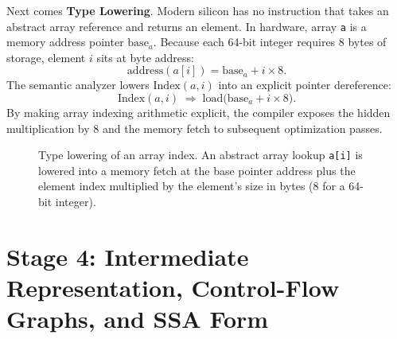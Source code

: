 Next comes \textbf{Type Lowering}. Modern silicon has no instruction that takes
an abstract array reference and returns an element. In hardware, array \texttt{a}
is a memory address pointer $\text{base}_a$. Because each 64-bit integer
requires $8$ bytes of storage, element $i$ sits at byte address:
\[
  \text{address}(a[i]) = \text{base}_a + i \times 8.
\]
The semantic analyzer lowers $\text{Index}(a, i)$ into an explicit pointer dereference:
\[
  \text{Index}(a, i) \;\Longrightarrow\; \text{load}\bigl(\text{base}_a + i \times 8\bigr).
\]
By making array indexing arithmetic explicit, the compiler exposes the hidden
multiplication by $8$ and the memory fetch to subsequent optimization passes.

\begin{figure}[H]
\centering
{}
\caption{Type lowering of an array index. An abstract array lookup \texttt{a[i]} is lowered into a memory fetch at the base pointer address plus the element index multiplied by the element's size in bytes ($8$ for a 64-bit integer).}
\label{ch41:fig-memory-layout}
\end{figure}

\section{Stage 4: Intermediate Representation, Control-Flow Graphs, and SSA Form}
\label{ch41:ir-ssa}

